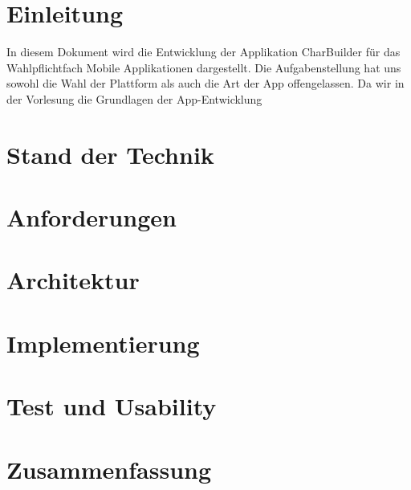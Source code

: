 \newpage
\section{Einleitung}
In diesem Dokument wird die Entwicklung der Applikation CharBuilder für das Wahlpflichtfach Mobile Applikationen dargestellt. Die Aufgabenstellung hat uns sowohl die Wahl der Plattform als auch die Art der App offengelassen. Da wir in der Vorlesung die Grundlagen der App-Entwicklung

\section{Stand der Technik}

\section{Anforderungen}

\section{Architektur}

\section{Implementierung}

\section{Test und Usability}

\section{Zusammenfassung}